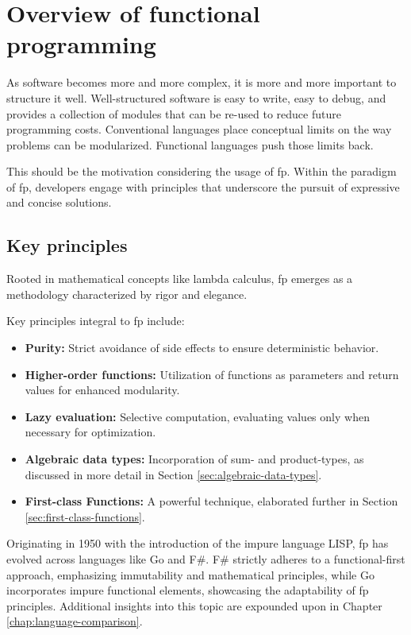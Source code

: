     \chapter{Overview of functional programming}\label{chap:functional-programming}
    \begin{shaded}
        \noindent
        \glqq{}As software becomes more and more complex, it is more and more important to structure it well. Well-structured software is easy to write, easy to debug, and provides a collection of modules that can be re-used to reduce future programming costs. Conventional languages place conceptual limits on the way problems can be modularized. Functional languages push those limits back.\grqq{} \cite{Hughes1989}
    \end{shaded}
    This should be the motivation considering the usage of \ac{fp}.
    Within the paradigm of \ac{fp}, developers engage with principles that underscore the pursuit of expressive and concise solutions.
    
\section{Key principles}
    
Rooted in mathematical concepts like lambda calculus, \ac{fp} emerges as a methodology characterized by rigor and elegance.

Key principles integral to \ac{fp} include:

\begin{itemize}
    \item \textbf{Purity:} Strict avoidance of side effects to ensure deterministic behavior.
    \item \textbf{Higher-order functions:} Utilization of functions as parameters and return values for enhanced modularity.
    \item \textbf{Lazy evaluation:} Selective computation, evaluating values only when necessary for optimization.
    \item \textbf{Algebraic data types:} Incorporation of sum- and product-types, as discussed in more detail in Section \ref{sec:algebraic-data-types}.
    \item \textbf{First-class Functions:} A powerful technique, elaborated further in Section \ref{sec:first-class-functions}.
\end{itemize}

Originating in 1950 with the introduction of the impure language LISP, \ac{fp} has evolved across languages like Go and F\#. F\# strictly adheres to a functional-first approach, emphasizing immutability and mathematical principles, while Go incorporates impure functional elements, showcasing the adaptability of \ac{fp} principles. Additional insights into this topic are expounded upon in Chapter \ref{chap:language-comparison}.

